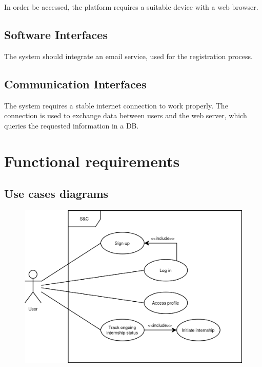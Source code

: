 In order be accessed, the platform requires a suitable device with a web browser.

\subsection{Software Interfaces}

The system should integrate an email service, used for the registration process.

\subsection{Communication Interfaces}

The system requires a stable internet connection to work properly.
The connection is used to exchange data between users and the web server, which queries the requested information in a DB.

\section{Functional requirements}

\subsection{Use cases diagrams}

\begin{figure}[H]
    \centering
    \includegraphics[width=0.3\linewidth]{../../assets/use-case-diagrams/user-common.png}
\end{figure}

